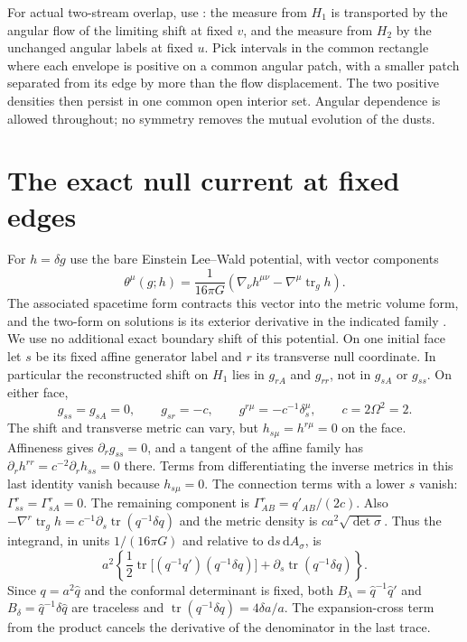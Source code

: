 \documentclass[11pt]{article}
\newcommand{\tr}{\operatorname{tr}}
\newcommand{\dd}{\mathrm d}
\begin{document}
For actual two-stream overlap, use
\cite[Prop.~7.7]{LR}: the measure from \(H_1\) is
transported by the angular flow of the limiting shift
at fixed \(v\), and the measure from \(H_2\) by the
unchanged angular labels at fixed \(u\). Pick intervals
in the common rectangle where each envelope is positive
on a common angular patch, with a smaller patch separated
from its edge by more than the flow displacement.
The two positive densities then persist in one common
open interior set. Angular dependence is allowed
throughout; no symmetry removes the mutual evolution
of the dusts.

\section{The exact null current at fixed edges}
\label{sec:current}

For \(h=\delta g\) use the bare Einstein Lee--Wald
potential, with vector components
\begin{equation}\label{eq:theta}
 \theta^\mu(g;h)
 =\frac{1}{16\pi G}
   \left(\nabla_\nu h^{\mu\nu}-\nabla^\mu\tr_g h\right).
\end{equation}
The associated spacetime form contracts this vector into
the metric volume form, and the two-form on solutions is
its exterior derivative in the indicated family
\cite{LW}. We use no additional exact boundary shift
of this potential. On one initial face let \(s\) be its
fixed affine generator label and \(r\) its transverse
null coordinate. In particular the reconstructed shift
on \(H_1\) lies in \(g_{rA}\) and \(g_{rr}\), not in
\(g_{sA}\) or \(g_{ss}\). On either face,
\[
 g_{ss}=g_{sA}=0,\qquad g_{sr}=-c,\qquad
 g^{r\mu}=-c^{-1}\delta_s^\mu,\qquad c=2\Omega^2=2 .
\]
The shift and transverse metric can vary, but
\(h_{s\mu}=h^{r\mu}=0\) on the face. Affineness gives
\(\partial_r g_{ss}=0\), and a tangent of the affine
family has \(\partial_r h^{rr}=c^{-2}\partial_r h_{ss}=0\)
there. Terms from differentiating the inverse metrics in
this last identity vanish because \(h_{s\mu}=0\).
The connection terms with a lower \(s\) vanish:
\(\Gamma^r_{ss}=\Gamma^r_{sA}=0\). The remaining
component is \(\Gamma^r_{AB}=q'_{AB}/(2c)\).
Also \(-\nabla^r\tr_g h=c^{-1}\partial_s
\tr(q^{-1}\delta q)\) and the metric density is
\(c a^2\sqrt{\det\sigma}\). Thus the integrand, in
units \(1/(16\pi G)\) and relative to
\(\dd s\,\dd A_\sigma\), is
\[
 a^2\left\{\frac12\tr\big[
       (q^{-1}q')(q^{-1}\delta q)\big]
       +\partial_s\tr(q^{-1}\delta q)\right\}.
\]
Since \(q=a^2\widehat q\) and the conformal determinant
is fixed, both \(B_\lambda=\widehat q^{-1}\widehat q'\)
and \(B_\delta=\widehat q^{-1}\delta\widehat q\) are
traceless and \(\tr(q^{-1}\delta q)=4\delta a/a\).
The expansion-cross term from the product cancels the
derivative of the denominator in the last trace.
\end{document}
